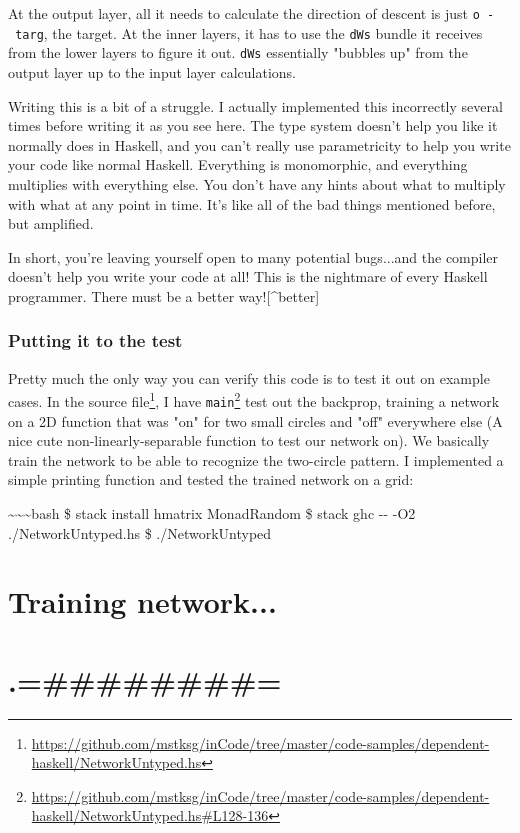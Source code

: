 \documentclass[]{article}
\renewcommand{\href}[2]{#2\footnote{\url{#1}}}
\begin{document}
At the output layer, all it needs to calculate the direction of descent is just
\texttt{o\ -\ targ}, the target. At the inner layers, it has to use the
\texttt{dWs} bundle it receives from the lower layers to figure it out.
\texttt{dWs} essentially "bubbles up" from the output layer up to the input
layer calculations.

Writing this is a bit of a struggle. I actually implemented this incorrectly
several times before writing it as you see here. The type system doesn't help
you like it normally does in Haskell, and you can't really use parametricity to
help you write your code like normal Haskell. Everything is monomorphic, and
everything multiplies with everything else. You don't have any hints about what
to multiply with what at any point in time. It's like all of the bad things
mentioned before, but amplified.

In short, you're leaving yourself open to many potential bugs...and the compiler
doesn't help you write your code at all! This is the nightmare of every Haskell
programmer. There must be a better way!{[}\^{}better{]}

\subsubsection{Putting it to the test}

Pretty much the only way you can verify this code is to test it out on example
cases. In the
\href{https://github.com/mstksg/inCode/tree/master/code-samples/dependent-haskell/NetworkUntyped.hs}{source
file}, I have
\href{https://github.com/mstksg/inCode/tree/master/code-samples/dependent-haskell/NetworkUntyped.hs\#L128-136}{\texttt{main}}
test out the backprop, training a network on a 2D function that was "on" for two
small circles and "off" everywhere else (A nice cute non-linearly-separable
function to test our network on). We basically train the network to be able to
recognize the two-circle pattern. I implemented a simple printing function and
tested the trained network on a grid:

\textasciitilde{}\textasciitilde{}\textasciitilde{}bash \$ stack install hmatrix
MonadRandom \$ stack ghc -\/- -O2 ./NetworkUntyped.hs \$ ./NetworkUntyped

\section{Training network...}

\section{.=\#\#\#\#\#\#\#\#=}
\end{document}
